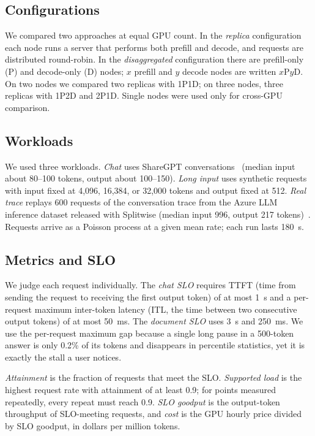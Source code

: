 \documentclass[11pt]{article}
\begin{document}
\subsection{Configurations}
We compared two approaches at equal GPU count. In the \emph{replica} configuration each node runs a server that performs both prefill and decode, and requests are distributed round-robin. In the \emph{disaggregated} configuration there are prefill-only (P) and decode-only (D) nodes; $x$ prefill and $y$ decode nodes are written $x$P$y$D. On two nodes we compared two replicas with 1P1D; on three nodes, three replicas with 1P2D and 2P1D. Single nodes were used only for cross-GPU comparison.

\subsection{Workloads}
We used three workloads. \emph{Chat} uses ShareGPT conversations~\cite{sharegpt} (median input about 80--100 tokens, output about 100--150). \emph{Long input} uses synthetic requests with input fixed at 4,096, 16,384, or 32,000 tokens and output fixed at 512. \emph{Real trace} replays 600 requests of the conversation trace from the Azure LLM inference dataset released with Splitwise (median input 996, output 217 tokens)~\cite{azuretrace}. Requests arrive as a Poisson process at a given mean rate; each run lasts 180~s.

\subsection{Metrics and SLO}
We judge each request individually. The \emph{chat SLO} requires TTFT (time from sending the request to receiving the first output token) of at most 1~s and a per-request maximum inter-token latency (ITL, the time between two consecutive output tokens) of at most 50~ms. The \emph{document SLO} uses 3~s and 250~ms. We use the per-request maximum gap because a single long pause in a 500-token answer is only 0.2\% of its tokens and disappears in percentile statistics, yet it is exactly the stall a user notices.

\emph{Attainment} is the fraction of requests that meet the SLO. \emph{Supported load} is the highest request rate with attainment of at least 0.9; for points measured repeatedly, every repeat must reach 0.9. \emph{SLO goodput} is the output-token throughput of SLO-meeting requests, and \emph{cost} is the GPU hourly price divided by SLO goodput, in dollars per million tokens.
\end{document}
